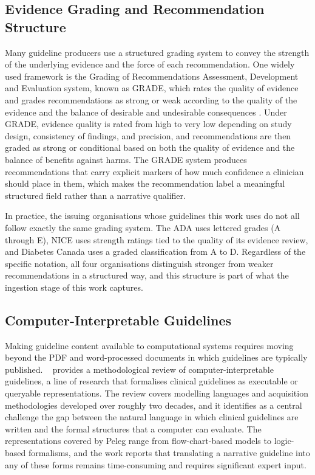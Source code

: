 \subsection{Evidence Grading and Recommendation Structure}
\label{sec:bg-guidelines-grade}

Many guideline producers use a structured grading system to convey the
strength of the underlying evidence and the force of each recommendation.
One widely used framework is the Grading of Recommendations Assessment,
Development and Evaluation system, known as GRADE, which rates the quality of
evidence and grades recommendations as strong or weak according to the quality
of the evidence and the balance of desirable and undesirable consequences
\cite{guyatt2011}.
Under GRADE, evidence quality is rated from high to very low depending on study
design, consistency of findings, and precision, and recommendations are then
graded as strong or conditional based on both the quality of evidence and the
balance of benefits against harms. The GRADE system produces recommendations
that carry explicit markers of how much confidence a clinician should place in
them, which makes the recommendation label a meaningful structured field rather
than a narrative qualifier.

In practice, the issuing organisations whose guidelines this work uses do not
all follow exactly the same grading system. The ADA uses lettered grades
(A through E), NICE uses strength ratings tied to the quality of its evidence
review, and Diabetes Canada uses a graded classification from A to D.
Regardless of the specific notation, all four organisations distinguish
stronger from weaker recommendations in a structured way, and this structure
is part of what the ingestion stage of this work captures.

\subsection{Computer-Interpretable Guidelines}
\label{sec:bg-guidelines-cig}

Making guideline content available to computational systems requires moving
beyond the PDF and word-processed documents in which guidelines are typically
published. ~\cite{peleg2013} provides a methodological review of
computer-interpretable guidelines, a line of research that formalises clinical
guidelines as executable or queryable representations. The review covers
modelling languages and acquisition methodologies developed over roughly two
decades, and it identifies as a central challenge the gap between the natural
language in which clinical guidelines are written and the formal structures
that a computer can evaluate. The representations covered by Peleg range
from flow-chart-based models to logic-based formalisms, and the work reports
that translating a narrative guideline into any of these forms remains
time-consuming and requires significant expert input.

